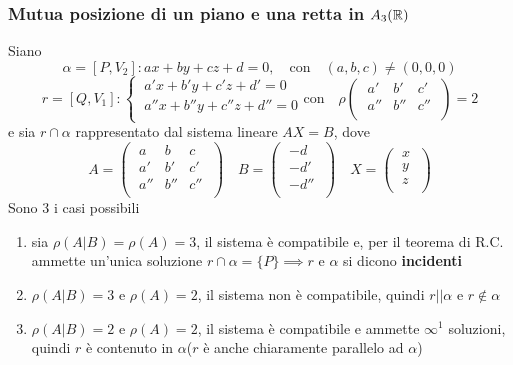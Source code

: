 \subsubsection{Mutua posizione di un piano e una retta in \(A_3(\RR )\)}
Siano \[
\alpha = [P, V_2]: ax + by + cz + d = 0, \quad \text{con}\quad (a,b,c) \neq (0,0,0) \]
\[
r=[Q, V_1]:
\begin{cases}
    \ a'x + b'y + c'z + d' = 0 \\
    \ a ''x + b ''y + c ''z + d '' = 0 \\
\end{cases} \text{con} \quad 
\rho
\left( \; \begin{matrix}
    a' & b' & c' \\
    a '' & b '' & c '' \\
\end{matrix} \; \right) = 2
\] e sia \(r \cap \alpha \) rappresentato dal sistema lineare \(AX = B\), dove \[
A =
\left( \; \begin{matrix}
    a & b & c \\
    a' & b' & c' \\
    a '' & b '' & c '' \\
\end{matrix} \; \right) \quad
B =
\left( \; \begin{matrix}
    -d \\
    -d' \\
    -d '' \\
\end{matrix} \; \right) \quad X =
\left( \; \begin{matrix}
    x \\
    y \\
    z \\
\end{matrix} \; \right) 
\] Sono 3 i casi possibili
\begin{enumerate}
    \item sia \(\rho(A|B) = \rho(A) =3\), il sistema è compatibile e, per il teorema di R.C. ammette un'unica soluzione \(r \cap \alpha  = \{P\} \implies r\) e \(\alpha \) si dicono \textbf{incidenti}
    \item \(\rho(A|B) = 3\) e \(\rho(A) =2\), il sistema non è compatibile, quindi \(r || \alpha \) e \(r \notin \alpha \) 
    \item \(\rho(A|B) = 2\) e \(\rho(A) = 2\), il sistema è compatibile e ammette \(\infty^{1}\) soluzioni, quindi \(r\) è contenuto in \(\alpha \)(\(r\) è anche chiaramente parallelo ad \(\alpha \))
\end{enumerate}

